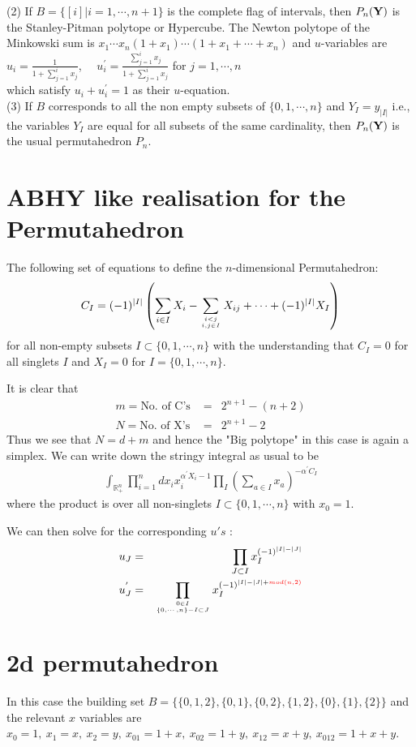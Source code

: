 \documentclass[hidelinks,12pt]{article}
\newcommand{\bea}[1]{\begin{eqnarray}\label{#1} }
\newcommand{\eea}{\end{eqnarray}}
\def\bea{\begin{eqnarray}}
\def\eea{\end{eqnarray}}
\begin{document}
(2) If $B= \{[i] | i=1,\cdots,n+1 \}$ is the complete flag of intervals, then $P_n({\bf Y})$ is the Stanley-Pitman polytope or Hypercube.
The Newton polytope of the Minkowski sum is $x_1\cdots x_n (1+x_1) \cdots (1+x_1+\cdots +x_n)$ and $u$-variables are 
$u_i =\frac{ 1}{1+\sum_{j=1}^{i} x_j} $, ~~$u^{'}_i =\frac{ \sum_{j=1}^{i} x_j}{1+\sum_{j=1}^{i} x_j} $ for $j=1,\cdots,n$ \\
which satisfy $u_i +u^{'}_{i} =1$ as their $u$-equation. \\

(3) If $B$ corresponds to all the non empty subsets of $\{0,1,\cdots,n \}$ and $Y_I =y_{|I|}$ i.e., the variables $Y_I$ are equal for all subsets of the same cardinality, then $P_n({\bf Y})$ is the usual permutahedron $P_n$. 

\section*{ABHY like realisation for the Permutahedron}
The following set of equations to define the $n$-dimensional Permutahedron: 
\bea
C_I = (-1)^{|I|} \left( \sum_{i \in I} X_i - \sum _{{i<j}\atop{i,j \in I}} X_{ij} +\cdots + (-1)^{|I|}  X_I \right) \nonumber
\eea
for all non-empty subsets $I \subset \{0,1,\cdots,n\}$ with the understanding that $C_{I} =0$ for all singlets $I$ and $X_{I} =0$ for $I=\{ 0,1,\cdots,n \}$. 

It is clear that
\bea
m= \text{No. of  C's }&=& 2^{n+1}-(n+2) \nonumber \\
N= \text{No. of X's} &=& 2^{n+1}- 2 \nonumber 
\eea
Thus we see that $N= d+m$ and hence the "Big polytope" in this case is again a simplex. We can write down the stringy integral as usual to be 
\bea
\int_{\mathbb{R}^{n}_{+}} \prod_{i =1}^{n} d x_i x_i^{\alpha^{'} X_i -1} \prod_{I} \left (\sum_{a\in I} x_a \right) ^{-\alpha^{'} C_I} \nonumber
\eea 
where the product is over all non-singlets $ I \subset \{0,1,\cdots,n\}$ with $x_{0} =1$.

We can then solve for the corresponding $u's$ :
\bea
u_J &=& ~~\prod_{J \subset I} x_I^{(-1)^{|I|-|J|}} \nonumber \\
u^{'}_J &=& \prod_{{0 \in I}\atop{ \{0,\cdots,n\} - I \subset J}} x_I^{(-1)^{|I|-|J|+\color{red}{mod(n, 2)}}} \nonumber
\eea

\section*{2d permutahedron}
In this case the building set $B=\{ \{ 0,1,2\},\{ 0,1\},\{0,2\},\{1,2\},\{0\},\{1\},\{2\}\}$ and the relevant $x$ variables are $x_0=1, ~x_1=x, ~x_2=y, ~x_{01}=1+x, ~x_{02}=1+y,~ x_{12}=x+y,~ x_{012}=1+x+y$. 
\end{document}
